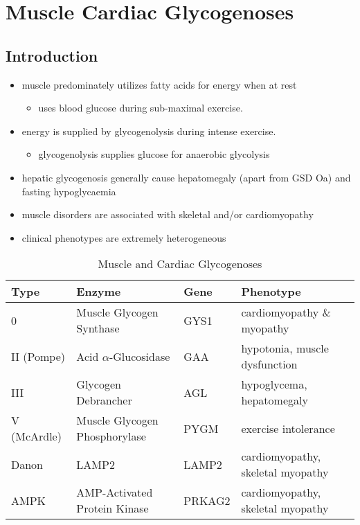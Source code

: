\documentclass{scrartcl}
\begin{document}
\section{Muscle Cardiac Glycogenoses}
\label{sec:org38abdad}
\subsection{Introduction}
\label{sec:orgd6c91fa}
\begin{itemize}
\item muscle predominately utilizes fatty acids for energy when at rest
\begin{itemize}
\item uses blood glucose during sub-maximal exercise.
\end{itemize}
\item energy is supplied by glycogenolysis during intense exercise.
\begin{itemize}
\item glycogenolysis supplies glucose for anaerobic glycolysis
\end{itemize}
\item hepatic glycogenosis generally cause hepatomegaly (apart from GSD
Oa) and fasting hypoglycaemia
\item muscle disorders are associated with skeletal and/or
cardiomyopathy
\item clinical phenotypes are extremely heterogeneous
\end{itemize}

\begin{table}[htbp]
\caption{\label{tab:org7e5351d}
Muscle and Cardiac Glycogenoses}
\centering
\begin{tabular}{llll}
Type & Enzyme & Gene & Phenotype\\
\hline
0 & Muscle Glycogen Synthase & GYS1 & cardiomyopathy \& myopathy\\
II (Pompe) & Acid \(\alpha\)-Glucosidase & GAA & hypotonia, muscle dysfunction\\
III & Glycogen Debrancher & AGL & hypoglycema, hepatomegaly\\
V (McArdle) & Muscle Glycogen Phosphorylase & PYGM & exercise intolerance\\
Danon & LAMP2 & LAMP2 & cardiomyopathy, \textpm{} skeletal myopathy\\
AMPK & AMP-Activated Protein Kinase & PRKAG2 & cardiomyopathy, \textpm{} skeletal myopathy\\
\end{tabular}
\end{table}
\end{document}
